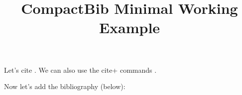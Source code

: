 \documentclass[11pt]{article}
\begin{document}
\title{CompactBib Minimal Working Example}
\maketitle

Let's cite \cite{kadofong2020a}. We can also use the cite+ commands \citep[e.g.][]{kadofong2020b}.

Now let's add the bibliography (below):\\


\end{document}
